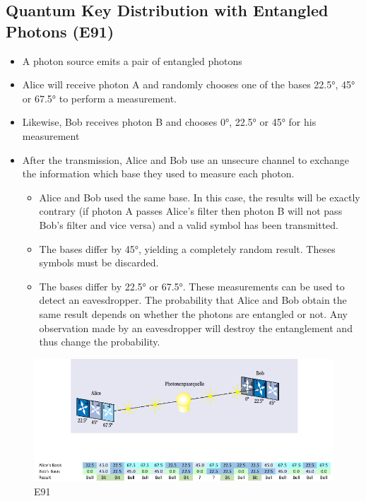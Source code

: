 \clearpage

\hypertarget{quantum-key-distribution-with-entangled-photons-e91}{%
\subsection{Quantum Key Distribution with Entangled Photons
(E91)}\label{quantum-key-distribution-with-entangled-photons-e91}}

\begin{itemize}
\tightlist
\item
  A photon source emits a pair of entangled photons
\item
  Alice will receive photon A and randomly chooses one of the bases
  22.5°, 45° or 67.5° to perform a measurement.
\item
  Likewise, Bob receives photon B and chooses 0°, 22.5° or 45° for his
  measurement
\item
  After the transmission, Alice and Bob use an unsecure channel to
  exchange the information which base they used to measure each photon.

  \begin{itemize}
  \tightlist
  \item
    Alice and Bob used the same base. In this case, the results will be
    exactly contrary (if photon A passes Alice's filter then photon B
    will not pass Bob's filter and vice versa) and a valid symbol has
    been transmitted.
  \item
    The bases differ by 45°, yielding a completely random result. Theses
    symbols must be discarded.
  \item
    The bases differ by 22.5° or 67.5°. These measurements can be used
    to detect an eavesdropper. The probability that Alice and Bob obtain
    the same result depends on whether the photons are entangled or not.
    Any observation made by an eavesdropper will destroy the
    entanglement and thus change the probability.
  \end{itemize}
\end{itemize}

\begin{figure}[H]
\centering
\includegraphics[width=1\textwidth]{figures/e91.png}
\caption{E91}
\end{figure}

\clearpage
